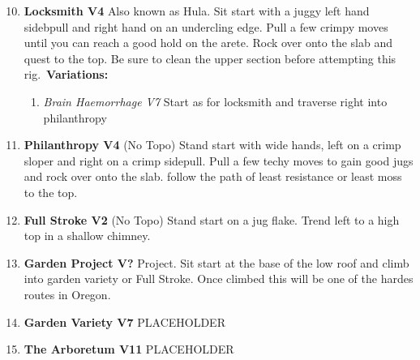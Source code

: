 \begin{enumerate}[]
	\setcounter{enumi}{9}
	\item\label{rt:Locksmith} \colorbox{RoyalBlue!20}{\textbf{Locksmith V4     \warn \warn } }
	\newline Also known as Hula. Sit start with a juggy left hand sidebpull and right hand on an undercling edge. Pull a few crimpy moves until you can reach a good hold on the arete. Rock over onto the slab and quest to the top. Be sure to clean the upper section before attempting this rig.\
	\newline \textbf{Variations:}
	\begin{enumerate}
		\item\label{vr:Brain Haemorrhage} \colorbox{Goldenrod!50}{\emph{Brain Haemorrhage V7  }  }
		\newline Start as for locksmith and traverse right into philanthropy\
	\end{enumerate}
	\setcounter{enumi}{10}
	\item\label{rt:Philanthropy} \colorbox{RoyalBlue!20}{\textbf{Philanthropy V4   \warn \warn } }
	\newline (No Topo) 
	\newline Stand start with wide hands, left on a crimp sloper and right on a crimp sidepull. Pull a few techy moves to gain good jugs and rock over onto the slab. follow the path of least resistance or least moss to the top.\
	\setcounter{enumi}{11}
	\item\label{rt:Full Stroke} \colorbox{green!20}{\textbf{Full Stroke V2    \warn } }
	\newline (No Topo) 
	\newline Stand start on a jug flake. Trend left to a high top in a shallow chimney.\
	\setcounter{enumi}{12}
	\item\label{rt:Garden Project} \colorbox{black!20}{\textbf{Garden Project V?  } }
	\newline Project. Sit start at the base of the low roof and climb into garden variety or Full Stroke. Once climbed this will be one of the hardes routes in Oregon.\
	\setcounter{enumi}{13}
	\item\label{rt:Garden Variety} \colorbox{Goldenrod!50}{\textbf{Garden Variety V7  } }
	\newline PLACEHOLDER\
	\setcounter{enumi}{14}
	\item\label{rt:The Arboretum} \colorbox{red!20}{\textbf{The Arboretum V11  } }
	\newline PLACEHOLDER\

\end{enumerate}
